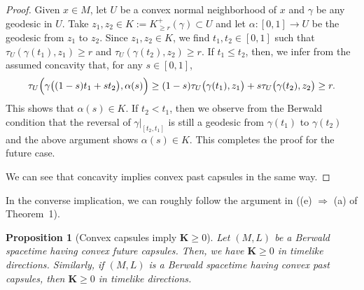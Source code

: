 \documentclass[a4paper,11pt]{article}
\numberwithin{equation}{section}
\theoremstyle{definition}
\theoremstyle{plain}
\newtheorem{proposition}[definition]{Proposition}
\newcommand{\lra}{\longrightarrow}
\newcommand{\bK}{\mathbf{K}}
\begin{document}
\begin{proof}
Given $x \in M$, let $U$ be a convex normal neighborhood of $x$ and $\gamma$ be any geodesic in $U$.
Take $z_1,z_2 \in K:=K_{\geq r}^+(\gamma) \subset U$ and let $\alpha\colon [0,1] \lra U$ be the geodesic from $z_1$ to $z_2$.
Since $z_1,z_2 \in K$, we find $t_1,t_2 \in [0,1]$ such that $\tau_U(\gamma(t_1),z_1) \geq r$ and $\tau_U(\gamma(t_2),z_2) \geq r$.
If $t_1 \le t_2$, then, we infer from the assumed concavity that, for any $s \in [0,1]$,
\[ \tau_U\Bigl( \gamma\bigl( (1-s)t_1 +st_2 \bigr),\alpha(s) \Bigr)
\geq (1-s)\tau_U\bigl( \gamma(t_1),z_1 \bigr) + s\tau_U\bigl( \gamma(t_2),z_2 \bigr)
\geq r. \]
This shows that $\alpha(s) \in K$.
If $t_2<t_1$, then we observe from the Berwald condition that the reversal of $\gamma|_{[t_2,t_1]}$ is still a geodesic %
from $\gamma(t_1)$ to $\gamma(t_2)$ and the above argument shows $\alpha(s)\in K$.
This completes the proof for the future case.

We can see that concavity implies convex past capsules in the same way.
\end{proof}

In the converse implication, we can roughly follow the argument in \cite{KK} ((e) $\Rightarrow$ (a) of Theorem~1). 

\begin{proposition}[Convex capsules imply $\bK \ge 0$]
\label{pr:cap-nnc}
Let $(M,L)$ be a Berwald spacetime having convex future capsules.
Then, we have $\bK \ge 0$ in timelike directions.
Similarly, if $(M,L)$ is a Berwald spacetime having convex past capsules, then $\bK \ge 0$ in timelike directions.
\end{proposition}
\end{document}
